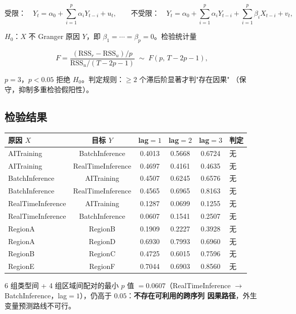 \documentclass{internal-report}
\begin{document}
\begin{equation}
  \text{受限：}\quad Y_t = \alpha_0 + \sum_{i=1}^{p}\alpha_i Y_{t-i} + u_t,
  \qquad
  \text{不受限：}\quad Y_t = \alpha_0 + \sum_{i=1}^{p}\alpha_i Y_{t-i}
    + \sum_{i=1}^{p}\beta_i X_{t-i} + v_t,
  \label{eq:granger}
\end{equation}

$H_0$：$X$ 不 Granger 原因 $Y$，即 $\beta_1=\cdots=\beta_p=0$。检验统计量

\begin{equation}
  F = \frac{(\text{RSS}_r - \text{RSS}_u)/p}{\text{RSS}_u/(T-2p-1)}
  \;\sim\; F(p,\, T-2p-1),
  \label{eq:grangerf}
\end{equation}

$p=3$，$p<0.05$ 拒绝 $H_0$。判定规则：$\ge 2$ 个滞后阶显著才判"存在因果"
（保守，抑制多重检验假阳性）。

\subsection{检验结果}

\begin{center}
\footnotesize
\begin{tabular}{lccccl}
\toprule
原因 $X$ & 目标 $Y$ & lag$=1$ & lag$=2$ & lag$=3$ & 判定 \\
\midrule
AITraining & BatchInference & 0.4013 & 0.5668 & 0.6724 & 无 \\
AITraining & RealTimeInference & 0.4697 & 0.4161 & 0.4635 & 无 \\
BatchInference & AITraining & 0.4507 & 0.6245 & 0.6576 & 无 \\
BatchInference & RealTimeInference & 0.4565 & 0.6965 & 0.8163 & 无 \\
RealTimeInference & AITraining & 0.1287 & 0.0699 & 0.1255 & 无 \\
RealTimeInference & BatchInference & 0.0607 & 0.1541 & 0.2507 & 无 \\
\midrule
RegionA & RegionB & 0.1909 & 0.2227 & 0.3928 & 无 \\
RegionA & RegionD & 0.6930 & 0.7993 & 0.6960 & 无 \\
RegionB & RegionC & 0.4725 & 0.6015 & 0.7596 & 无 \\
RegionE & RegionF & 0.7044 & 0.6903 & 0.8560 & 无 \\
\bottomrule
\end{tabular}
\end{center}

6 组类型间 + 4 组区域间配对的最小 $p$ 值 $=0.0607$（RealTimeInference
$\to$ BatchInference，lag$=1$），仍高于 $0.05$：\textbf{不存在可利用的跨序列
因果路径}，外生变量预测路线不可行。
\end{document}
